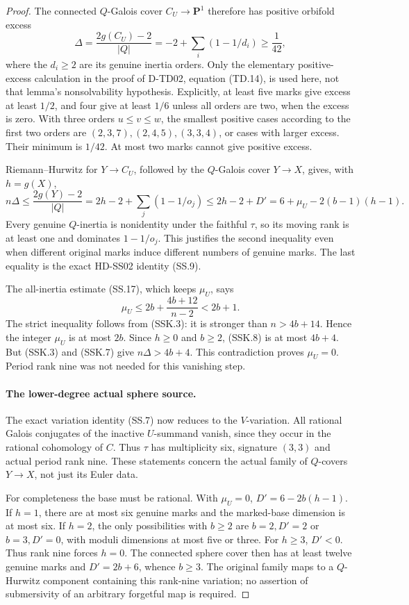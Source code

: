 \begin{proof}
The connected \(Q\)-Galois cover \(C_U\longrightarrow\mathbf P^1\)
therefore has positive orbifold excess
\[
 \Delta=\frac{2g(C_U)-2}{|Q|}
        =-2+\sum_i(1-1/d_i)\ge\frac1{42},
 \tag{SSK.7}
\]
where the \(d_i\ge2\) are its genuine inertia orders.
Only the elementary positive-excess calculation in the proof of
D-TD02, equation (TD.14), is used here, not that lemma's
nonsolvability hypothesis. Explicitly, at least five marks give
excess at least \(1/2\), and four give at least \(1/6\) unless
all orders are two, when the excess is zero. With three orders
\(u\le v\le w\), the smallest positive cases according to the
first two orders are \((2,3,7),(2,4,5),(3,3,4)\), or cases
with larger excess. Their minimum is \(1/42\).
At most two marks cannot give positive excess.

Riemann--Hurwitz for \(Y\longrightarrow C_U\), followed by the
\(Q\)-Galois cover \(Y\longrightarrow X\), gives, with \(h=g(X)\),
\[
 n\Delta
 \le\frac{2g(Y)-2}{|Q|}
 =2h-2+\sum_j(1-1/o_j)
 \le2h-2+D'
 =6+\mu_U-2(b-1)(h-1).
 \tag{SSK.8}
\]
Every genuine \(Q\)-inertia is nonidentity under the faithful
\(\tau\), so its moving rank is at least one and dominates
\(1-1/o_j\). This justifies the second inequality even when
different original marks induce different numbers of genuine marks.
The last equality is the exact HD-SS02 identity (SS.9).

The all-inertia estimate (SS.17), which keeps \(\mu_U\), says
\[
          \mu_U\le2b+\frac{4b+12}{n-2}<2b+1.
 \tag{SSK.9}
\]
The strict inequality follows from (SSK.3): it is stronger than
\(n>4b+14\). Hence the integer \(\mu_U\) is at most \(2b\).
Since \(h\ge0\) and \(b\ge2\), (SSK.8) is at most \(4b+4\).
But (SSK.3) and (SSK.7) give \(n\Delta>4b+4\).
This contradiction proves \(\mu_U=0\).
Period rank nine was not needed for this vanishing step.

\paragraph{The lower-degree actual sphere source.}
The exact variation identity (SS.7) now reduces to the \(V\)-variation.
All rational Galois conjugates of the inactive \(U\)-summand vanish,
since they occur in the rational cohomology of \(C\).
Thus \(\tau\) has multiplicity six, signature \((3,3)\) and actual
period rank nine. These statements concern the actual family
of \(Q\)-covers \(Y\longrightarrow X\), not just its Euler data.

For completeness the base must be rational. With \(\mu_U=0\),
\(D'=6-2b(h-1)\). If \(h=1\), there are at most six genuine
marks and the marked-base dimension is at most six. If \(h=2\),
the only possibilities with \(b\ge2\) are \(b=2,D'=2\) or
\(b=3,D'=0\), with moduli dimensions at most five or three.
For \(h\ge3\), \(D'<0\). Thus rank nine forces \(h=0\).
The connected sphere cover then has at least twelve genuine
marks and \(D'=2b+6\), whence \(b\ge3\).
The original family maps to a \(Q\)-Hurwitz component containing
this rank-nine variation; no assertion of submersivity of an
arbitrary forgetful map is required.


\end{proof}
